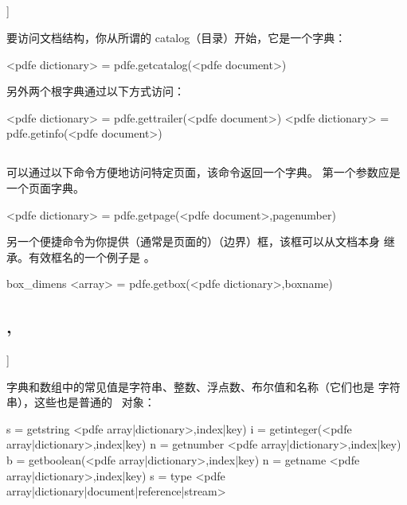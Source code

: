 \subsection{{\type {get[catalog|trailer|info}}}]


要访问文档结构，你从所谓的 catalog（目录）开始，它是一个字典：

\begin{typing}
<pdfe dictionary> = pdfe.getcatalog(<pdfe document>)
\end{typing}

另外两个根字典通过以下方式访问：

\begin{typing}
<pdfe dictionary> = pdfe.gettrailer(<pdfe document>)
<pdfe dictionary> = pdfe.getinfo(<pdfe document>)
\end{typing}

\subsection{}


可以通过以下命令方便地访问特定页面，该命令返回一个字典。
第一个参数应是一个页面字典。

\begin{typing}
<pdfe dictionary> = pdfe.getpage(<pdfe document>,pagenumber)
\end{typing}

另一个便捷命令为你提供（通常是页面的）（边界）框，该框可以从文档本身
继承。有效框名的一个例子是 。

\begin{typing}
box_dimens <array> = pdfe.getbox(<pdfe dictionary>,boxname)
\end{typing}

\subsection{{\type {get[string|integer|number|boolean|name}}, }]


字典和数组中的常见值是字符串、整数、浮点数、布尔值和名称（它们也是
字符串），这些也是普通的 \LUA\ 对象：

\begin{typing}
s = getstring <pdfe array|dictionary>,index|key)
i = getinteger(<pdfe array|dictionary>,index|key)
n = getnumber <pdfe array|dictionary>,index|key)
b = getboolean(<pdfe array|dictionary>,index|key)
n = getname   <pdfe array|dictionary>,index|key)
s = type      <pdfe array|dictionary|document|reference|stream>
\end{typing}

